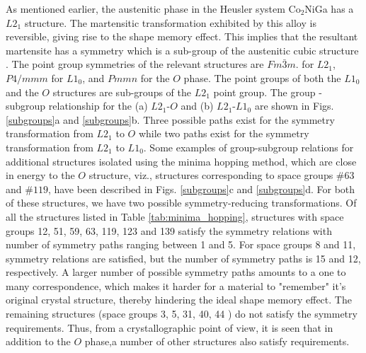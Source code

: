 \documentclass[%
preprint,
 amsmath,amssymb,
 aps,
prb,
showkeys,
]{revtex4-1}
\begin{document}
As mentioned earlier, the austenitic phase in the Heusler system Co$_2$NiGa has a $L2_1$ structure. The martensitic transformation exhibited by this alloy is reversible, giving rise to the shape memory effect. This implies that the resultant martensite has a symmetry which is a sub-group of the austenitic cubic structure \cite{bhattacharya1998theory}.  The point group symmetries of the relevant structures are  $Fm\bar{3}m$.  for $L2_1$,  $P4/mmm$ for $L1_0$, and $Pmmn$ for the $O$ phase.  The point groups of both the $L1_0$ and the $O$  structures are sub-groups of the $L2_1$  point group. The group - subgroup relationship for the (a) $L2_1$-$O$ and  (b) $L2_1$-$L1_0$ are shown in Figs. \ref{subgroups}a and \ref{subgroups}b. Three possible paths  exist for the symmetry transformation from $L2_1$ to $O$ while two paths exist for the symmetry transformation from $L2_1$ to $L1_0$. Some examples of group-subgroup relations for additional structures isolated using the minima hopping method, which are close in energy to the $O$ structure, viz., structures corresponding 
to space groups $\#63$  and $\#119$, have been described in Figs. \ref{subgroups}c and \ref{subgroups}d. For both of these structures, we have two possible symmetry-reducing transformations. Of all the structures listed in Table \ref{tab:minima_hopping}, structures with space groups 12, 51, 59, 63, 119, 123 and 139 satisfy the symmetry relations with number of symmetry paths ranging between 1 and 5. For space groups 8 and 11, symmetry relations are satisfied, but the number of symmetry paths is 15 and 12, respectively. A larger number of possible symmetry paths amounts to a one to many correspondence, which makes it harder for a material to "remember" it's original crystal structure, thereby hindering the ideal shape memory effect. The remaining structures (space groups 3, 5, 31, 40, 44 ) do not satisfy the symmetry requirements. Thus, from a crystallographic point of view, it is seen that in addition to the $O$ phase,a number of other structures also satisfy requirements.
\end{document}
